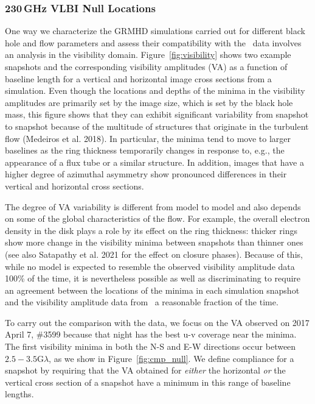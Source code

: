 \subsubsection{230\,GHz VLBI Null Locations}


One way we characterize the GRMHD simulations carried out for
different black hole and flow parameters and assess their
compatibility with the \sgra\ data involves an analysis in the visibility
domain.
Figure~\ref{fig:visibility} shows two example snapshots and the
corresponding visibility amplitudes (VA) as a function of baseline
length for a vertical and horizontal image cross sections from a
simulation.
Even though the locations and depths of the minima in the visibility
amplitudes are primarily set by the image size, which is set by the
black hole mass, this figure shows that they can exhibit significant
variability from snapshot to snapshot because of the multitude of
structures that originate in the turbulent flow (Medeiros et
al. 2018).
In particular, the minima tend to move to larger baselines as the ring
thickness temporarily changes in response to, e.g., the appearance of
a flux tube or a similar structure.
In addition, images that have a higher degree of azimuthal asymmetry
show pronounced differences in their vertical and horizontal cross
sections.

The degree of VA variability is different from model to model and also
depends on some of the global characteristics of the flow.
For example, the overall electron density in the disk plays a role by
its effect on the ring thickness: thicker rings show more change in
the visibility minima between snapshots than thinner ones (see also
Satapathy et al. 2021 for the effect on closure phases).
Because of this, while no model is expected to resemble the observed
visibility amplitude data 100\% of the time, it is nevertheless
possible as well as discriminating to require an agreement between the
locations of the minima in each simulation snapshot and the visibility
amplitude data from \sgra\ a reasonable fraction of the time.

To carry out the comparison with the data, we focus on the VA observed
on 2017 April 7, \#3599 because that night has the best u-v coverage
near the minima.
The first visibility minima in both the N-S and E-W directions occur
between $2.5-3.5$\;G$\lambda$, as we show in
Figure~\ref{fig:cmp_null}.
We define compliance for a snapshot by requiring that the VA obtained
for {\it either} the horizontal {\it or} the vertical cross section of
a snapshot have a minimum in this range of baseline lengths.


